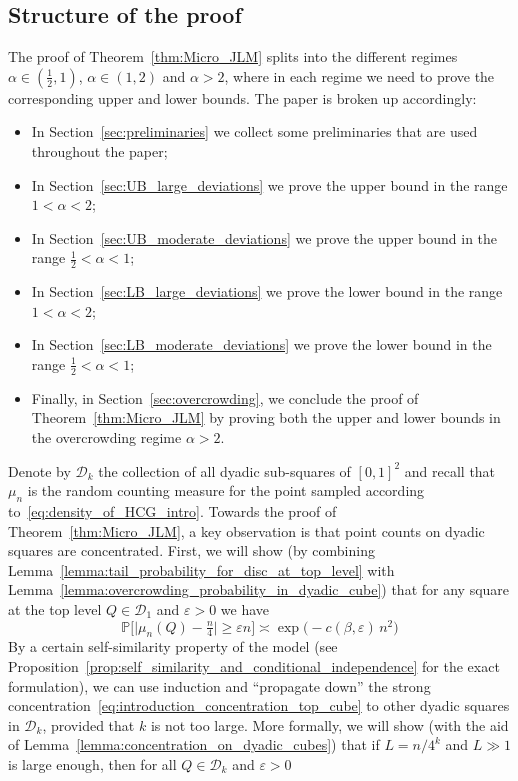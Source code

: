 \documentclass[11pt]{amsart}
\theoremstyle{definition}
\theoremstyle{remark}
\numberwithin{equation}{section}
\def\eps{{\varepsilon}}
\newcommand{\bP}{\mathbb P}
\begin{document}
	\subsection{Structure of the proof}\label{sec:ideas_from_the_proof}
	The proof of Theorem~\ref{thm:Micro_JLM} splits into the different regimes $\alpha\in(\tfrac{1}{2},1)$, $\alpha\in(1,2)$ and $\alpha>2$, where in each regime we need to prove the corresponding upper and lower bounds. The paper is broken up accordingly:
	\begin{itemize}
		\item In Section~\ref{sec:preliminaries} we collect some preliminaries that are used throughout the paper;
		\item In Section~\ref{sec:UB_large_deviations} we prove the upper bound in the range $1<\alpha<2$;
		\item In Section~\ref{sec:UB_moderate_deviations} we prove the upper bound in the range $\frac{1}{2}<\alpha<1$;
		\item In Section~\ref{sec:LB_large_deviations} we prove the lower bound in the range $1<\alpha<2$;
		\item In Section~\ref{sec:LB_moderate_deviations} we prove the lower bound in the range $\frac{1}{2}<\alpha<1$;
		\item Finally, in Section~\ref{sec:overcrowding}, we conclude the proof of Theorem~\ref{thm:Micro_JLM} by proving both the upper and lower bounds in the overcrowding regime $\alpha>2$.
	\end{itemize}
	Denote by $\mathcal{D}_k$ the collection of all dyadic sub-squares of $[0,1]^2$ and recall that $\mu_n$ is the random counting measure for the point sampled according to~\eqref{eq:density_of_HCG_intro}. Towards the proof of Theorem~\ref{thm:Micro_JLM}, a key observation is that point counts on dyadic squares are concentrated. First, we will show (by combining Lemma~\ref{lemma:tail_probability_for_disc_at_top_level} with Lemma~\ref{lemma:overcrowding_probability_in_dyadic_cube}) that for any square at the top level $Q\in \mathcal{D}_1$ and $\eps>0$ we have
	\begin{equation}
		\label{eq:introduction_concentration_top_cube}
		\bP\Big[ \big|\mu_n(Q) - \tfrac{n}{4}\big| \ge \eps n\Big] \asymp \exp\Big( - c(\beta,\eps) \, n^2 \Big)
	\end{equation}
	By a certain self-similarity property of the model (see Proposition~\ref{prop:self_similarity_and_conditional_independence} for the exact formulation), we can use induction and ``propagate down'' the strong concentration~\eqref{eq:introduction_concentration_top_cube} to other dyadic squares in $\mathcal{D}_k$, provided that $k$ is not too large. More formally, we will show (with the aid of Lemma~\ref{lemma:concentration_on_dyadic_cubes}) that if $L=n/4^k$ and $L\gg 1$ is large enough, then for all $Q\in \mathcal{D}_k$ and $\eps>0$
\end{document}
